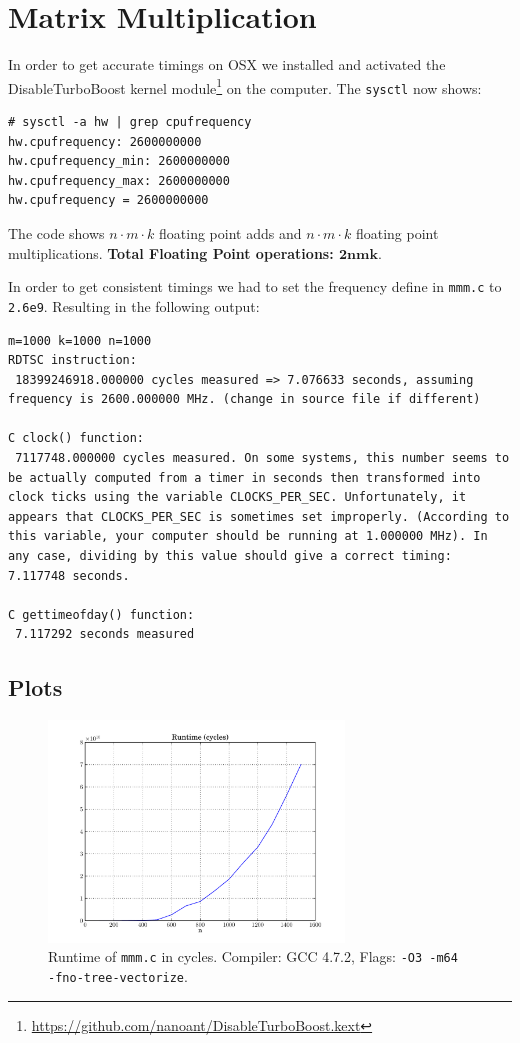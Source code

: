 \documentclass[portrait,a4paper]{article}
\begin{document}
\section{Matrix Multiplication}
In order to get accurate timings on OSX we installed and activated the DisableTurboBoost kernel module\footnote{\url{https://github.com/nanoant/DisableTurboBoost.kext}} on the computer. The \lstinline{sysctl} now shows:
\begin{lstlisting}[caption=Bash output of the sysctl command]
# sysctl -a hw | grep cpufrequency
hw.cpufrequency: 2600000000
hw.cpufrequency_min: 2600000000
hw.cpufrequency_max: 2600000000
hw.cpufrequency = 2600000000
\end{lstlisting}


The code shows $n\cdot m\cdot k$ floating point adds and $n\cdot m\cdot k$ floating point multiplications. \textbf{Total Floating Point operations: $\mathbf{2nmk}$}.

In order to get consistent timings we had to set the frequency define in \lstinline{mmm.c} to \lstinline{2.6e9}. Resulting in the following output:
\begin{lstlisting}[caption=Execution of the \lstinline{mmm.c} code compiled with GCC 4.7.2 and the flags \lstinline{-O3 -m64 -fno-tree-vectorize}.]
m=1000 k=1000 n=1000
RDTSC instruction:
 18399246918.000000 cycles measured => 7.076633 seconds, assuming frequency is 2600.000000 MHz. (change in source file if different)

C clock() function:
 7117748.000000 cycles measured. On some systems, this number seems to be actually computed from a timer in seconds then transformed into clock ticks using the variable CLOCKS_PER_SEC. Unfortunately, it appears that CLOCKS_PER_SEC is sometimes set improperly. (According to this variable, your computer should be running at 1.000000 MHz). In any case, dividing by this value should give a correct timing: 7.117748 seconds.

C gettimeofday() function:
 7.117292 seconds measured
\end{lstlisting}
\subsection{Plots}
\begin{figure}[H]
\centering
\includegraphics[width=0.7\textwidth]{mmm/Runtimecycles.pdf}
\caption{Runtime of \lstinline{mmm.c} in cycles. Compiler: GCC 4.7.2, Flags: \lstinline{-O3 -m64 -fno-tree-vectorize}.}
\end{figure}
\end{document}
